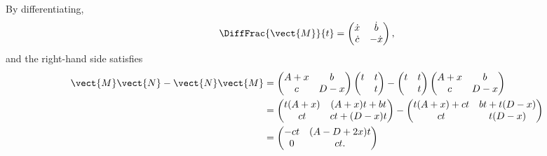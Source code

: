 \begin{enumerate}
          By differentiating,
          \[
              \DiffFrac{\vect{M}}{t} = \begin{pmatrix}
                  \dot{x} & \dot{b} \\ \dot{c} & -\dot{x}
              \end{pmatrix},
          \]
          and the right-hand side satisfies
          \begin{align*}
              \vect{M} \vect{N} - \vect{N} \vect{M} & = \begin{pmatrix}
                                                            A + x & b \\ c & D - x
                                                        \end{pmatrix}
              \begin{pmatrix}
                  t & t \\ & t
              \end{pmatrix}
              - \begin{pmatrix}
                    t & t \\ & t
                \end{pmatrix}
              \begin{pmatrix}
                  A + x & b \\ c & D - x
              \end{pmatrix}                                                \\
                                                    & = \begin{pmatrix}
                                                            t (A + x) & (A + x) t + bt \\
                                                            ct        & ct + (D - x) t
                                                        \end{pmatrix}
              -
              \begin{pmatrix}
                  t (A + x) + ct & bt + t(D - x) \\
                  ct             & t(D - x)
              \end{pmatrix}                                       \\
                                                    & =\begin{pmatrix}
                                                           -ct & (A - D + 2x)t \\
                                                           0   & ct.
                                                       \end{pmatrix}
          \end{align*}


\end{enumerate}
